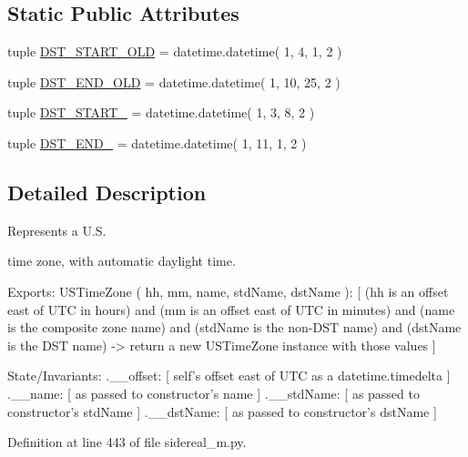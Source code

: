 \subsection*{Static Public Attributes}
\begin{DoxyCompactItemize}
\item 
tuple \hyperlink{classamonpy_1_1sim_1_1sidereal__m_1_1_u_s_time_zone_a6a44aff78ec6d41c874c5a47faad7bbe}{D\-S\-T\-\_\-\-S\-T\-A\-R\-T\-\_\-\-O\-L\-D} = datetime.\-datetime( 1, 4, 1, 2 )
\item 
tuple \hyperlink{classamonpy_1_1sim_1_1sidereal__m_1_1_u_s_time_zone_a6b3c892f985cb258686c386b1f2adee1}{D\-S\-T\-\_\-\-E\-N\-D\-\_\-\-O\-L\-D} = datetime.\-datetime( 1, 10, 25, 2 )
\item 
tuple \hyperlink{classamonpy_1_1sim_1_1sidereal__m_1_1_u_s_time_zone_a175d1e09720df8704393ae8c0a8c4bbd}{D\-S\-T\-\_\-\-S\-T\-A\-R\-T\-\_} = datetime.\-datetime( 1, 3, 8, 2 )
\item 
tuple \hyperlink{classamonpy_1_1sim_1_1sidereal__m_1_1_u_s_time_zone_a3aebe85ce10342323455d00f174ec2e5}{D\-S\-T\-\_\-\-E\-N\-D\-\_} = datetime.\-datetime( 1, 11, 1, 2 )
\end{DoxyCompactItemize}


\subsection{Detailed Description}
Represents a U.\-S. 

time zone, with automatic daylight time. \begin{DoxyVerb}  Exports:
    USTimeZone ( hh, mm, name, stdName, dstName ):
      [ (hh is an offset east of UTC in hours) and
        (mm is an offset east of UTC in minutes) and
        (name is the composite zone name) and
        (stdName is the non-DST name) and
        (dstName is the DST name) ->
          return a new USTimeZone instance with those values ]

  State/Invariants:
    .__offset:
      [ self's offset east of UTC as a datetime.timedelta ]
    .__name:      [ as passed to constructor's name ]
    .__stdName:   [ as passed to constructor's stdName ]
    .__dstName:   [ as passed to constructor's dstName ]\end{DoxyVerb}
 

Definition at line 443 of file sidereal\-\_\-m.\-py.



